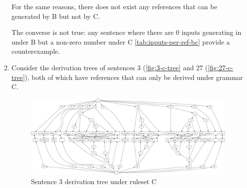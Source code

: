 \documentclass[a4paper,oneside,reqno]{amsart}
\begin{document}
\begin{enumerate}[label=\arabic*.]
    For the same reasons, there does not exist any references that can be
    generated by B but not by C.

    The converse is not true: any sentence where there are 0 inputs generating
    in under B but a non-zero number under C \autoref{tab:inputs-per-ref-bc}
    provide a counterexample.

  \item Consider the derivation trees of sentences 3 (\autoref{fig:3-c-tree}
    and 27 (\autoref{fig:27-c-tree}), both of which have references that can
    only be derived under grammar C.
    \begin{figure}[H]
      \begin{center}
        \includegraphics[scale=0.2]{../output/tree3Cdvn1.jpg}
      \end{center}
      \caption{Sentence 3 derivation tree under ruleset C}
      \label{fig:3-c-tree}
    \end{figure}
    \begin{figure}[H]
      \begin{center}

\end{center}
\end{figure}
\end{enumerate}
\end{document}
